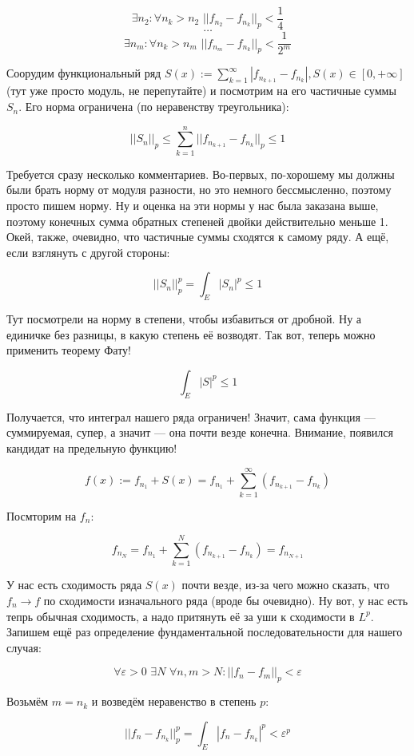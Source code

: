 \documentclass{article}
\def\dbl{\,\,}
\begin{document}
\[\exists n_2: \forall n_k > n_2 \dbl ||f_{n_2} - f_{n_k}||_p < \frac{1}{4}\]
\[\ldots\]
\[\exists n_m: \forall n_k > n_m \dbl ||f_{n_m} - f_{n_k}||_p < \frac{1}{2^m}\]

Соорудим функциональный ряд $S(x) := \sum_{k = 1}^{\infty} |f_{n_{k + 1}} - f_{n_k}|, S(x) \in [0, +\infty]$ (тут уже просто модуль, не перепутайте) и посмотрим на его частичные суммы $S_n$. Его норма ограничена (по неравенству треугольника):

\[||S_n||_p \le \sum_{k = 1}^{n} ||f_{n_{k + 1}} - f_{n_k}||_p \le 1\]

Требуется сразу несколько комментариев. Во-первых, по-хорошему мы должны были брать норму от модуля разности, но это немного бессмысленно, поэтому просто пишем норму. Ну и оценка на эти нормы у нас была заказана выше, поэтому конечных сумма обратных степеней двойки действительно меньше 1. Окей, также, очевидно, что частичные суммы сходятся к самому ряду. А ещё, если взглянуть с другой стороны:

\[||S_n||_p^p = \int_{E} |S_n|^p \le 1\]

Тут посмотрели на норму в степени, чтобы избавиться от дробной. Ну а единичке без разницы, в какую степень её возводят. Так вот, теперь можно применить теорему Фату!

\[\int_{E} |S|^p \le 1\]

Получается, что интеграл нашего ряда ограничен! Значит, сама функция --- суммируемая, супер, а значит --- она почти везде конечна. Внимание, появился кандидат на предельную функцию!

\[f(x) := f_{n_1} + S(x) = f_{n_1} + \sum_{k = 1}^{\infty} (f_{n_{k + 1}} - f_{n_k})\]

Посмторим на $f_n$:

\[f_{n_N} = f_{n_1} + \sum_{k = 1}^{N} (f_{n_{k + 1}} - f_{n_k}) = f_{n_{N + 1}}\]

У нас есть сходимость ряда $S(x)$ почти везде, из-за чего можно сказать, что $f_n \rightarrow f$ по сходимости изначального ряда (вроде бы очевидно). Ну вот, у нас есть тепрь обычная сходимость, а надо притянуть её за уши к сходимости в $L^p$. Запишем ещё раз определение фундаментальной последовательности для нашего случая:

\[\forall \varepsilon > 0 \dbl \exists N \dbl \forall n, m > N: ||f_n - f_m||_p < \varepsilon\]

Возьмём $m = n_k$ и возведём неравенство в степень $p$:

\[||f_n - f_{n_k}||_p^p = \int_{E} |f_n - f_{n_k}|^p < \varepsilon^p\]
\end{document}
